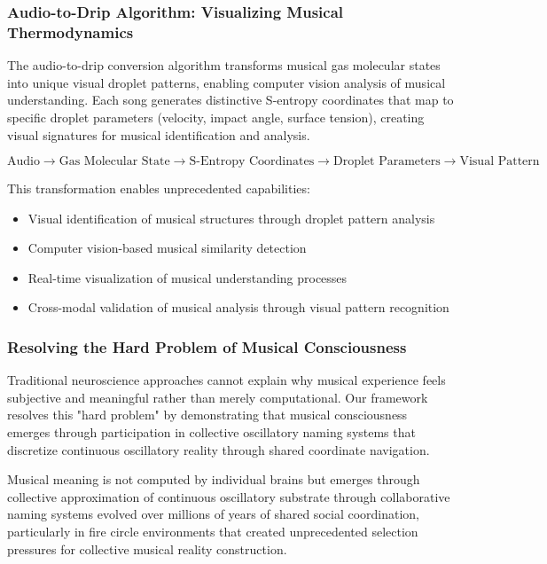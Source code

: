 \subsubsection{Audio-to-Drip Algorithm: Visualizing Musical Thermodynamics}

The audio-to-drip conversion algorithm transforms musical gas molecular states into unique visual droplet patterns, enabling computer vision analysis of musical understanding. Each song generates distinctive S-entropy coordinates that map to specific droplet parameters (velocity, impact angle, surface tension), creating visual signatures for musical identification and analysis.

\begin{equation}
\text{Audio} \rightarrow \text{Gas Molecular State} \rightarrow \text{S-Entropy Coordinates} \rightarrow \text{Droplet Parameters} \rightarrow \text{Visual Pattern}
\end{equation}

This transformation enables unprecedented capabilities:
\begin{itemize}
\item Visual identification of musical structures through droplet pattern analysis
\item Computer vision-based musical similarity detection
\item Real-time visualization of musical understanding processes
\item Cross-modal validation of musical analysis through visual pattern recognition
\end{itemize}

\subsubsection{Resolving the Hard Problem of Musical Consciousness}

Traditional neuroscience approaches cannot explain why musical experience feels subjective and meaningful rather than merely computational. Our framework resolves this "hard problem" by demonstrating that musical consciousness emerges through participation in collective oscillatory naming systems that discretize continuous oscillatory reality through shared coordinate navigation.

Musical meaning is not computed by individual brains but emerges through collective approximation of continuous oscillatory substrate through collaborative naming systems evolved over millions of years of shared social coordination, particularly in fire circle environments that created unprecedented selection pressures for collective musical reality construction.

